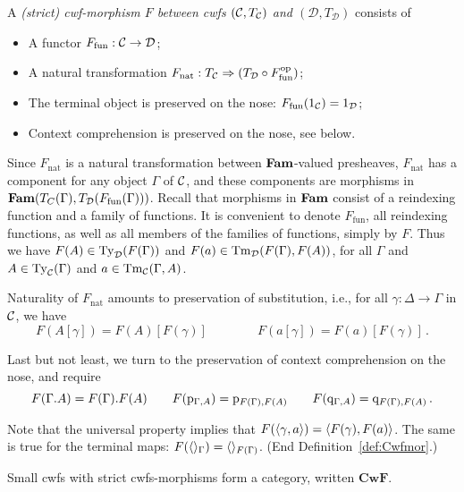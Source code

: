 \documentclass{lmcs}
\def\D{\mathcal{D}}
\def\V{\mathrm{V}}
\def\Cwf{\mathbf{CwF}}
\def\nt{\mathrm{nat}}
\def\fun{\mathrm{fun}}
\begin{document}
\begin{definition}\label{def:Cwfmor}
A \emph{(strict) cwf-morphism $F$ between cwfs $({\mathcal C},T_{\mathcal C})$ and $(\D,T_\D)$}
consists of

\begin{itemize}

\item A functor $F_\fun : \C \to \D$;
\item A natural transformation $F_\nt : T_\C \Rightarrow (T_\D \circ F_\fun^\op)$;
\item The terminal object is preserved on the nose: $F_\fun(1_{\C}) = 1_{\D}$;
\item Context comprehension is preserved on the nose, see below.
\end{itemize}

Since $F_\nt$ is a natural transformation between $\textbf{Fam}$-valued presheaves,
$F_\nt$ has a component for any object $\Gamma$ of ${\mathcal C}$, and
these components are morphisms in $\Fam(T_C(\Gamma),T_\D(F_\fun(\Gamma)))$.
Recall that morphisms in $\textbf{Fam}$ consist of a reindexing function
and a family of functions. It is convenient to denote $F_\fun$,
all reindexing functions, as well as all members of the families of functions,
simply by $F$. Thus we have $F(A) \in \Ty_\D(F(\Gamma))$
and $F(a) \in \Tm_\D(F(\Gamma), F(A))$, for all $\Gamma$
and $A\in\mathrm{Ty}_{\mathcal C}(\Gamma)$ and $a\in \mathrm{Tm}_{\mathcal C}(\Gamma, A)$.

Naturality of $F_\nt$
amounts to preservation of substitution, {i.e.}, for all
$\gamma : \Delta \to \Gamma$ in ${\mathcal C}$, we have
\[
F(A[\gamma]) = F(A)[F(\gamma)] \qquad \qquad
F(a[\gamma]) = F(a)[F(\gamma)]\,.
\]

Last but not least, we turn to the preservation of context comprehension
on the nose, and require
\[
F(\Gamma. A) = F(\Gamma). F(A) \qquad
F(\mathrm{p}_{\Gamma, A}) = \mathrm{p}_{F(\Gamma), F(A)} \qquad
F(\mathrm{q}_{\Gamma, A}) = \mathrm{q}_{F(\Gamma), F(A)}\,.
\]

Note that the universal property implies that
$F(\langle \gamma,a \rangle) = \langle F(\gamma),F(a) \rangle$.
The same is true for the terminal maps:
$F(\langle  \rangle_\Gamma) = \langle  \rangle_{F(\Gamma)}$.
(End Definition~\ref{def:Cwfmor}.)
\end{definition}

Small cwfs with strict cwfs-morphisms form a category, written $\Cwf$.
\end{document}
